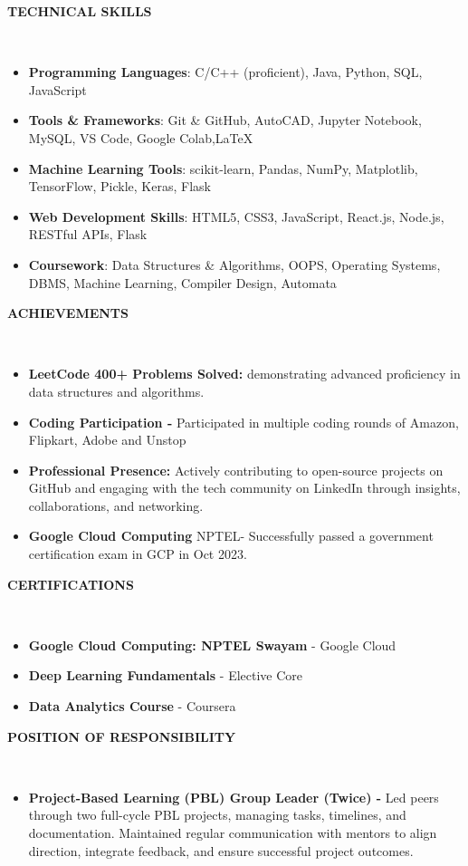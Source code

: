 \documentclass[a4paper,10pt]{article}
\newcommand{\lsep}{-0.5cm}
\newcommand{\resheading}[1]{{\small \colorbox{mygrey}{\begin{minipage}{0.975\textwidth}{\textbf{#1 \vphantom{p\^{E}}}}\end{minipage}}}}
\begin{document}
\resheading{\textbf{TECHNICAL SKILLS} }\\[\lsep]
\begin{itemize}
\setlength\itemsep{0em}
\item \noindent \textbf{Programming Languages}: C/C++ (proficient), Java, Python, SQL, JavaScript

\item \noindent \textbf{Tools \& Frameworks}: Git \& GitHub, AutoCAD, Jupyter Notebook, MySQL, VS Code, Google Colab,\LaTeX

\item \noindent \textbf{Machine Learning Tools}: scikit-learn, Pandas, NumPy, Matplotlib, TensorFlow, Pickle, Keras, Flask

\item \noindent \textbf{Web Development Skills}: HTML5, CSS3, JavaScript, React.js, Node.js, RESTful APIs, Flask

\item \noindent \textbf{Coursework}: Data Structures \& Algorithms, OOPS, Operating Systems, DBMS, Machine Learning, Compiler Design, Automata
\end{itemize}

\resheading{\textbf{ACHIEVEMENTS} }\\[\lsep]  
\begin{itemize}  
\setlength\itemsep{0em}  
\item \textbf{LeetCode 400+ Problems Solved:} demonstrating advanced proficiency in data structures and algorithms.
\item \textbf{Coding Participation -} Participated in multiple coding rounds of Amazon, Flipkart, Adobe and Unstop
\item \textbf{Professional Presence:} Actively contributing to open-source projects on GitHub and engaging with the tech community on LinkedIn through insights, collaborations, and networking.
\item \textbf{Google Cloud Computing} NPTEL- Successfully passed a government certification exam in GCP in Oct 2023.
\end{itemize}

\resheading{\textbf{CERTIFICATIONS} }\\[\lsep]
\begin{itemize}
\setlength\itemsep{0em}
\item \textbf{Google Cloud Computing: NPTEL Swayam} - Google Cloud
\item \textbf{Deep Learning Fundamentals} - Elective Core
\item \textbf{Data Analytics Course} - Coursera
\end{itemize}

\resheading{\textbf{ POSITION OF RESPONSIBILITY} }\\[\lsep]
\begin{itemize}
\setlength\itemsep{0em}
\item \textbf{Project-Based Learning (PBL) Group Leader (Twice) - } 
Led peers through two full-cycle PBL projects, managing tasks, timelines, and documentation. Maintained regular communication with mentors to align direction, integrate feedback, and ensure successful project outcomes.
\end{itemize}
\end{document}

